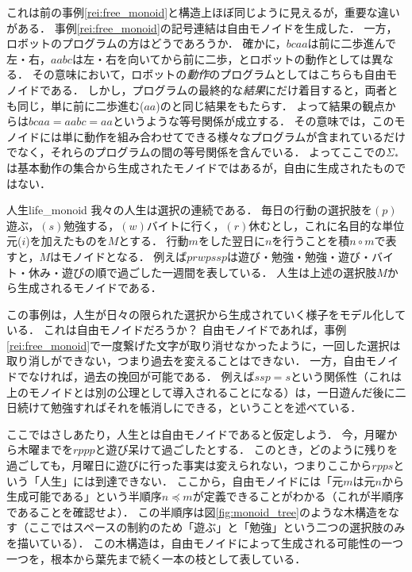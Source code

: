 \documentclass[11pt,a4paper, dvipdfmx]{jsarticle}
\begin{document}
これは前の事例\ref{rei:free_monoid}と構造上ほぼ同じように見えるが，重要な違いがある．
事例\ref{rei:free_monoid}の記号連結は自由モノイドを生成した．
一方，ロボットのプログラムの方はどうであろうか．
確かに，$bcaa$は前に二歩進んで左・右，$aabc$は左・右を向いてから前に二歩，とロボットの動作としては異なる．
その意味において，ロボットの\emph{動作}のプログラムとしてはこちらも自由モノイドである．
しかし，プログラムの最終的な\emph{結果}にだけ着目すると，両者とも同じ，単に前に二歩進む($aa$)のと同じ結果をもたらす．
よって結果の観点からは$bcaa = aabc = aa$というような等号関係が成立する．
その意味では，このモノイドには単に動作を組み合わせてできる様々なプログラムが含まれているだけでなく，それらのプログラムの間の等号関係を含んでいる．
よってここでの$\Sigma_*$は基本動作の集合から生成されたモノイドではあるが，自由に生成されたものではない．



\begin{rei}{人生}{life_monoid}
    我々の人生は選択の連続である．
    毎日の行動の選択肢を$(p)$ 遊ぶ，$(s)$勉強する，$(w)$バイトに行く，$(r)$休むとし，これに名目的な単位元($i$)を加えたものを$M$とする．
    行動$m$をした翌日に$n$を行うことを積$n \circ m$で表すと，$M$はモノイドとなる．
    例えば$prwpssp$は遊び・勉強・勉強・遊び・バイト・休み・遊びの順で過ごした一週間を表している．
    人生は上述の選択肢$M$から生成されるモノイドである．
\end{rei}

この事例は，人生が日々の限られた選択から生成されていく様子をモデル化している．
これは自由モノイドだろうか？
自由モノイドであれば，事例\ref{rei:free_monoid}で一度繋げた文字が取り消せなかったように，一回した選択は取り消しができない，つまり過去を変えることはできない．
一方，自由モノイドでなければ，過去の挽回が可能である．
例えば$ssp = s$という関係性（これは上のモノイドとは別の公理として導入されることになる）は，一日遊んだ後に二日続けて勉強すればそれを帳消しにできる，ということを述べている．

ここではさしあたり，人生とは自由モノイドであると仮定しよう．
今，月曜から木曜までを$rppp$と遊び呆けて過ごしたとする．
このとき，どのように残りを過ごしても，月曜日に遊びに行った事実は変えられない，つまりここから$rpps$という「人生」には到達できない．
ここから，自由モノイドには「元$m$は元$n$から生成可能である」という半順序$n \preceq m$が定義できることがわかる（これが半順序であることを確認せよ）．
この半順序は図\ref{fig:monoid_tree}のような木構造をなす（ここではスペースの制約のため「遊ぶ」と「勉強」という二つの選択肢のみを描いている）．
この木構造は，自由モノイドによって生成される可能性の一つ一つを，根本から葉先まで続く一本の枝として表している．
\end{document}
